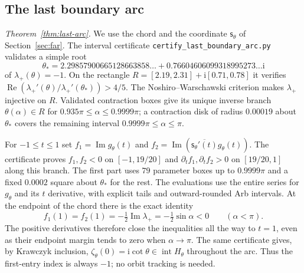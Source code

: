 \documentclass[11pt]{amsart}
\theoremstyle{definition}
\newcommand{\ii}{\mathrm{i}}
\begin{document}
\subsection{The last boundary arc}\label{app:lastarc}
\emph{Theorem~\ref{thm:last-arc}.}  We use the chord and the coordinate $\mathsf s_\theta$ of Section~\ref{sec:far}.
The interval certificate \texttt{certify\_last\_boundary\_arc.py} validates
a simple root
\[
 \theta_* = 2.29857900665128663858\ldots
              +0.76604606099318995273\ldots\ii
\]
of $\lambda_+(\theta)=-1$.  On the rectangle
$R=[2.19,2.31]+\ii[0.71,0.78]$ it verifies
$\operatorname{Re}(\lambda_+'(\theta)/\lambda_+'(\theta_*))>4/5$.
The Noshiro--Warschawski criterion makes $\lambda_+$ injective on $R$.
Validated contraction boxes give its unique inverse branch
$\theta(\alpha)\in R$ for $0.935\pi\le\alpha\le0.9999\pi$;
a contraction disk of radius $0.00019$ about $\theta_*$ covers the remaining
interval $0.9999\pi\le\alpha\le\pi$.

For $-1\le t\le1$ set
$f_1=\operatorname{Im}g_\theta(t)$ and
$f_2=\operatorname{Im}(\overline{\mathsf s_\theta'(t)}g_\theta(t))$.
The certificate proves $f_1,f_2<0$ on $[-1,19/20]$ and
$\partial_t f_1,\partial_t f_2>0$ on $[19/20,1]$ along this branch.
The first part uses $79$ parameter boxes up to $0.9999\pi$ and a fixed
$0.0002$ square about $\theta_*$ for the rest.  The evaluations use the
entire series for $g_\theta$ and its $t$ derivative, with explicit tails and
outward-rounded Arb intervals.  At the endpoint of the chord there is the
exact identity
\[
 f_1(1)=f_2(1)=-\tfrac12\operatorname{Im}\lambda_+
                =-\tfrac12\sin\alpha<0 \qquad(\alpha<\pi).
\]
The positive derivatives therefore close the inequalities all the way to
$t=1$, even as their endpoint margin tends to zero when $\alpha\to\pi$.
The same certificate gives, by Krawczyk inclusion,
$\zeta_\theta(0)=\ii\cot\theta\in\operatorname{int}H_\theta$
throughout the arc.  Thus the first-entry index is always $-1$; no orbit
tracking is needed.
\end{document}
